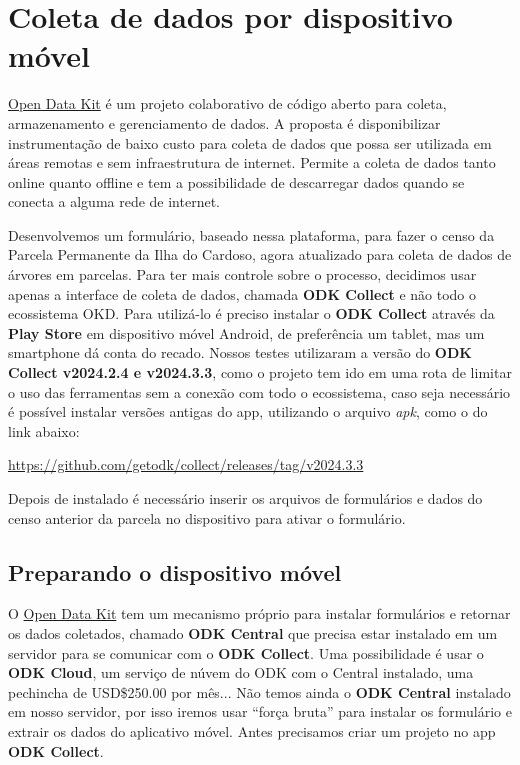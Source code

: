 
\section{Coleta de dados por dispositivo móvel}
\label{sec:coleta_de_dados_por_dispositivo_movel}


\href{https://opendatakit.org/}{Open Data Kit} é um projeto colaborativo de código aberto para coleta, armazenamento e gerenciamento de dados. A proposta é disponibilizar instrumentação de baixo custo para coleta de dados que possa ser utilizada em áreas remotas e sem infraestrutura de internet. Permite a coleta de dados tanto online quanto offline e tem a possibilidade de descarregar dados quando se conecta a alguma rede de internet.

Desenvolvemos um formulário, baseado nessa plataforma, para fazer o censo da Parcela Permanente da Ilha do Cardoso, agora atualizado para coleta de dados de árvores em parcelas. 
Para ter mais controle sobre o processo, decidimos usar apenas a interface de coleta de dados, chamada \textbf{ODK Collect} e não todo o ecossistema OKD. Para utilizá-lo é preciso instalar o \textbf{ODK Collect} através da \textbf{Play Store} em dispositivo móvel Android, de preferência um tablet, mas um smartphone dá conta do recado. Nossos testes utilizaram a versão do \textbf{ODK Collect v2024.2.4 e v2024.3.3}, como o projeto tem ido em uma rota de limitar o uso das ferramentas sem a conexão com todo o ecossistema, caso seja necessário é possível instalar versões antigas do app, utilizando o arquivo \textit{apk}, como o do link abaixo:

\url{https://github.com/getodk/collect/releases/tag/v2024.3.3}


Depois de instalado é necessário inserir os arquivos de formulários e dados do censo anterior da parcela no dispositivo para ativar o formulário.

\subsection{Preparando o dispositivo móvel}
\label{sec:preparando_o_dispositivo_movel}

O \href{https://opendatakit.org/}{Open Data Kit} tem um mecanismo próprio para instalar formulários e retornar os dados coletados, chamado \textbf{ODK Central} que precisa estar instalado em um servidor para se comunicar com o \textbf{ODK Collect}. Uma possibilidade é usar o \textbf{ODK Cloud}, um serviço de núvem do ODK  com o Central instalado, uma pechincha de USD\$250.00 por mês... Não temos ainda o \textbf{ODK Central} instalado em nosso servidor, por isso iremos usar ``força bruta'' para instalar os formulário e extrair os dados do aplicativo móvel. Antes precisamos criar um projeto no  app \textbf{ODK Collect}. 

